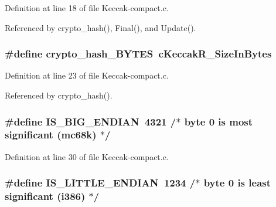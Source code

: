 Definition at line 18 of file Keccak-\/compact.\-c.



Referenced by crypto\-\_\-hash(), Final(), and Update().

\hypertarget{Keccak-compact_8c_a66cae38ae55f1b947696d9099b5c3087}{
\subsubsection[{crypto\-\_\-hash\-\_\-\-B\-Y\-T\-E\-S}]{\setlength{\rightskip}{0pt plus 5cm}\#define crypto\-\_\-hash\-\_\-\-B\-Y\-T\-E\-S~{\bf c\-Keccak\-R\-\_\-\-Size\-In\-Bytes}}}\label{Keccak-compact_8c_a66cae38ae55f1b947696d9099b5c3087}


Definition at line 23 of file Keccak-\/compact.\-c.



Referenced by crypto\-\_\-hash().

\hypertarget{Keccak-compact_8c_a0fdc6fe49d3e76c9ed558321df1decef}{
\subsubsection[{I\-S\-\_\-\-B\-I\-G\-\_\-\-E\-N\-D\-I\-A\-N}]{\setlength{\rightskip}{0pt plus 5cm}\#define I\-S\-\_\-\-B\-I\-G\-\_\-\-E\-N\-D\-I\-A\-N~4321 /$\ast$ {\bf byte} 0 is most significant (mc68k) $\ast$/}}\label{Keccak-compact_8c_a0fdc6fe49d3e76c9ed558321df1decef}


Definition at line 30 of file Keccak-\/compact.\-c.

\hypertarget{Keccak-compact_8c_a30f87dfd7349d5165f116b550c35c6ed}{
\subsubsection[{I\-S\-\_\-\-L\-I\-T\-T\-L\-E\-\_\-\-E\-N\-D\-I\-A\-N}]{\setlength{\rightskip}{0pt plus 5cm}\#define I\-S\-\_\-\-L\-I\-T\-T\-L\-E\-\_\-\-E\-N\-D\-I\-A\-N~1234 /$\ast$ {\bf byte} 0 is least significant (i386) $\ast$/}}\label{Keccak-compact_8c_a30f87dfd7349d5165f116b550c35c6ed}



